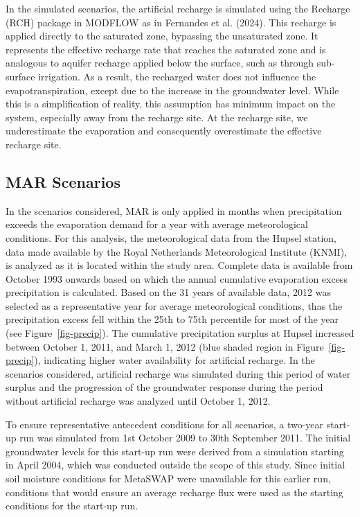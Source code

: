 \documentclass[
]{agujournal2019}
\begin{document}
In the simulated scenarios, the artificial recharge is simulated using
the Recharge (RCH) package in MODFLOW as in Fernandes et al. (2024).
This recharge is applied directly to the saturated zone, bypassing the
unsaturated zone. It represents the effective recharge rate that reaches
the saturated zone and is analogous to aquifer recharge applied below
the surface, such as through sub-surface irrigation. As a result, the
recharged water does not influence the evapotranspiration, except due to
the increase in the groundwater level. While this is a simplification of
reality, this assumption has minimum impact on the system, especially
away from the recharge site. At the recharge site, we underestimate the
evaporation and consequently overestimate the effective recharge site.

\subsection{MAR Scenarios}\label{sec-scenarios-considered}

In the scenarios considered, MAR is only applied in months when
precipitation exceeds the evaporation demand for a year with average
meteorological conditions. For this analysis, the meteorological data
from the Hupsel station, data made available by the Royal Netherlands
Meteorological Institute (KNMI), is analyzed as it is located within the
study area. Complete data is available from October 1993 onwards based
on which the annual cumulative evaporation excess precipitation is
calculated. Based on the 31 years of available data, 2012 was selected
as a representative year for average meteorological conditions, thas the
precipitation excess fell within the 25th to 75th percentile for most of
the year (see Figure~\ref{fig-precip}). The cumulative precipitation
surplus at Hupsel increased between October 1, 2011, and March 1, 2012
(blue shaded region in Figure~\ref{fig-precip}), indicating higher water
availability for artificial recharge. In the scenarios considered,
artificial recharge was simulated during this period of water surplus
and the progression of the groundwater response during the period
without artificial recharge was analyzed until October 1, 2012.

To ensure representative antecedent conditions for all scenarios, a
two-year start-up run was simulated from 1st October 2009 to 30th
September 2011. The initial groundwater levels for this start-up run
were derived from a simulation starting in April 2004, which was
conducted outside the scope of this study. Since initial soil moisture
conditions for MetaSWAP were unavailable for this earlier run,
conditions that would ensure an average recharge flux were used as the
starting conditions for the start-up run.
\end{document}
